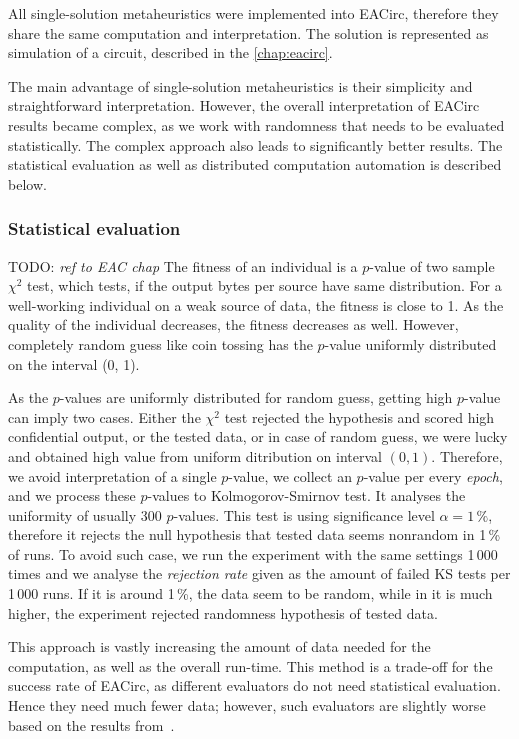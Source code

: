 \documentclass[
  print, %
  Table,   %
  nolof,     %
  nolot,     %
  11pt, %
  oneside  %
]{fithesis3}
\newcommand{\todo}[1]{TODO: \textit{#1}}
\begin{document}
All single-solution metaheuristics were implemented into EACirc, therefore they share the same computation and interpretation. The solution is represented as simulation of a circuit, described in the \cref{chap:eacirc}.

The main advantage of single-solution metaheuristics is their simplicity and straightforward interpretation. However, the overall interpretation of EACirc results became complex, as we work with randomness that needs to be evaluated statistically. The complex approach also leads to significantly better results. The statistical evaluation as well as distributed computation automation is described below.


\subsubsection{\textbf{Statistical evaluation}}
\label{subsubsec:method-spec-ss-stat}

\todo{ref to EAC chap}
The fitness of an individual is a $p$-value of two sample $\chi^{2}$ test, which tests, if the output bytes per source have same distribution. For a well-working individual on a weak source of data, the fitness is close to 1. As the quality of the individual decreases, the fitness decreases as well. However, completely random guess like coin tossing has the $p$-value uniformly distributed on the interval (0, 1).

As the $p$-values are uniformly distributed for random guess, getting high $p$-value can imply two cases. Either the $\chi^{2}$ test rejected the hypothesis and scored high confidential output, or the tested data, or in case of random guess, we were lucky and obtained high value from uniform ditribution on interval $(0, 1)$. Therefore, we avoid interpretation of a single $p$-value, we collect an $p$-value per every \textit{epoch}, and we process these $p$-values to Kolmogorov-Smirnov test. It analyses the uniformity of usually 300 $p$-values. This test is using significance level $\alpha = 1\,\%$, therefore it rejects the null hypothesis that tested data seems nonrandom in 1\,\% of runs. To avoid such case, we run the experiment with the same settings 1\,000 times and we analyse the \textit{rejection rate} given as the amount of failed KS tests per 1\,000 runs. If it is around 1\,\%, the data seem to be random, while in it is much higher, the experiment rejected randomness hypothesis of tested data.

This approach is vastly increasing the amount of data needed for the computation, as well as the overall run-time. This method is a trade-off for the success rate of EACirc, as different evaluators do not need statistical evaluation. Hence they need much fewer data; however, such evaluators are slightly worse based on the results from~\cite{svenda2013towards}.
\end{document}
